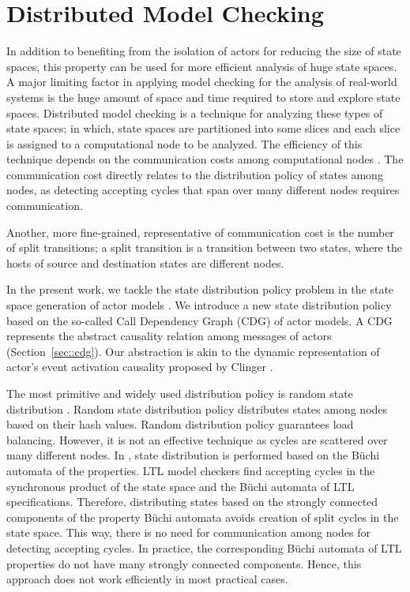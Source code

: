 \section{Distributed Model Checking} \label{sec::DMC}
In addition to benefiting from the isolation of actors for reducing the size of state spaces, this property can be used for more efficient analysis of huge state spaces. A major limiting factor in applying model checking for the analysis of real-world systems is the huge amount of space and time required to store and explore state spaces. Distributed model checking is a technique for analyzing these types of state spaces; in which, state spaces are partitioned into some slices and each slice is assigned to a computational node to be analyzed. The efficiency of this technique depends on the communication costs among computational nodes \cite{distributionPolicy}. 
The communication cost directly relates to the distribution policy of states among nodes, 
as detecting accepting cycles that span over many different nodes requires communication. 

Another, more fine-grained, representative of communication cost is the number of split transitions; 
a split transition is a transition between two states,  where the hosts of source and destination states are different nodes. 

In the present work, we tackle the state distribution policy problem in the 
state space generation of actor models \cite{Hewitt72}. We introduce a new state distribution policy based on the so-called Call Dependency Graph (CDG) of actor models. A CDG represents the abstract causality relation among messages of actors (Section~\ref{sec::cdg}). Our abstraction is akin to the dynamic representation of actor's event activation causality proposed by Clinger \cite{clinger}. 

The most primitive and widely used distribution policy is random state distribution \cite{DBLP:journals/entcs/GaravelMS13,DBLP:journals/entcs/BarnatHR13,DBLP:journals/corr/abs-1111-0374,acceptingPredecessor}. Random state distribution policy distributes states among nodes based on their hash values. Random distribution policy guarantees load balancing. However, it is not an effective technique as cycles are scattered over many different nodes. In \cite{clusterBased}, state distribution is performed based on the B\"{u}chi automata of the properties. LTL model checkers find accepting cycles in the synchronous product of the state space and the B\"{u}chi automata of LTL specifications. Therefore, distributing states based on the strongly connected components of the property B\"{u}chi automata avoids creation of split cycles in the state space. This way, there is no need for communication among nodes for detecting accepting cycles. In practice, the corresponding B\"{u}chi automata of LTL properties do not have many strongly connected components. Hence, this approach does not work efficiently in most practical cases.


